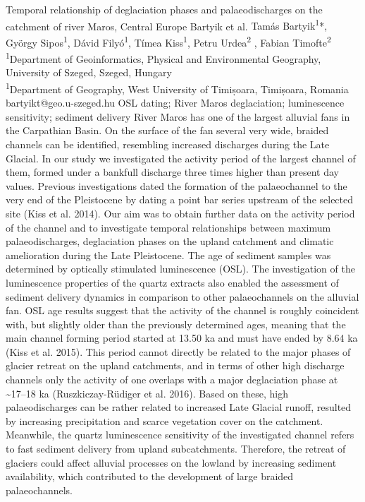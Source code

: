 \abstract
{Temporal relationship of deglaciation phases and palaeodischarges on the catchment of river Maros, Central Europe} %
{Bartyik et al.} %
{Tamás Bartyik\textsuperscript{1}*, György Sipos\textsuperscript{1}, Dávid Filyó\textsuperscript{1}, Tímea Kiss\textsuperscript{1}, Petru Urdea\textsuperscript{2} , Fabian Timofte\textsuperscript{2}} %
{\TLtag} %
{\textsuperscript{1}Department of Geoinformatics, Physical and Environmental Geography, University of Szeged, Szeged, Hungary\\
\textsuperscript{1}Department of Geography, West University of Timișoara, Timișoara, Romania
} %
{bartyikt@geo.u-szeged.hu}  %
{OSL dating; River Maros deglaciation; luminescence sensitivity; sediment delivery}%
{River Maros has one of the largest alluvial fans in the Carpathian Basin. On the surface of the fan several very wide, braided channels can be identified, resembling increased discharges during the Late Glacial. In our study we investigated the activity period of the largest channel of them, formed under a bankfull discharge three times higher than present day values. Previous investigations dated the formation of the palaeochannel to the very end of the Pleistocene by dating a point bar series upstream of the selected site (Kiss et al. 2014). Our aim was to obtain further data on the activity period of the channel and to investigate temporal relationships between maximum palaeodischarges, deglaciation phases on the upland catchment and climatic amelioration during the Late Pleistocene. The age of sediment samples was determined by optically stimulated luminescence (OSL). The investigation of the luminescence properties of the quartz extracts also enabled the assessment of sediment delivery dynamics in comparison to other palaeochannels on the alluvial fan. 
OSL age results suggest that the activity of the channel is roughly coincident with, but slightly older than the previously determined ages, meaning that the main channel forming period started at 13.50 ka and must have ended by 8.64 ka (Kiss et al. 2015). This period cannot directly be related to the major phases of glacier retreat on the upland catchments, and in terms of other high discharge channels only the activity of one overlaps with a major deglaciation phase at \textasciitilde17--18 ka (Ruszkiczay-Rüdiger et al. 2016). Based on these, high palaeodischarges can be rather related to increased Late Glacial runoff, resulted by increasing precipitation and scarce vegetation cover on the catchment. Meanwhile, the quartz luminescence sensitivity of the investigated channel refers to fast sediment delivery from upland subcatchments. Therefore, the retreat of glaciers could affect alluvial processes on the lowland by increasing sediment availability, which contributed to the development of large braided palaeochannels.
}%
